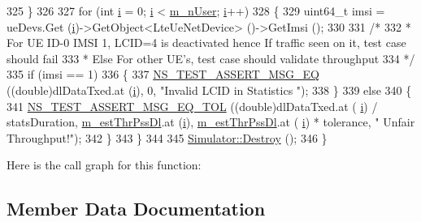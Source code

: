 \begin{DoxyCode}
325     \}
326 
327   \textcolor{keywordflow}{for} (\textcolor{keywordtype}{int} \hyperlink{bernuolliDistribution_8m_a6f6ccfcf58b31cb6412107d9d5281426}{i} = 0; \hyperlink{bernuolliDistribution_8m_a6f6ccfcf58b31cb6412107d9d5281426}{i} < \hyperlink{classns3_1_1LenaDeactivateBearerTestCase_a119f58840a145a5be90eef6e01784ee6}{m\_nUser}; \hyperlink{bernuolliDistribution_8m_a6f6ccfcf58b31cb6412107d9d5281426}{i}++)
328     \{
329       uint64\_t imsi = ueDevs.Get (\hyperlink{bernuolliDistribution_8m_a6f6ccfcf58b31cb6412107d9d5281426}{i})->GetObject<LteUeNetDevice> ()->GetImsi ();
330 
331       \textcolor{comment}{/*}
332 \textcolor{comment}{       * For UE ID-0 IMSI 1, LCID=4 is deactivated hence If traffic seen on it, test case should fail}
333 \textcolor{comment}{       * Else For other UE's, test case should validate throughput}
334 \textcolor{comment}{       */}
335       \textcolor{keywordflow}{if} (imsi == 1)
336         \{
337           \hyperlink{group__testing_ga2a9d78cffb3db8e867c35fff0b698cf5}{NS\_TEST\_ASSERT\_MSG\_EQ} ((\textcolor{keywordtype}{double})dlDataTxed.at (\hyperlink{bernuolliDistribution_8m_a6f6ccfcf58b31cb6412107d9d5281426}{i}), 0, \textcolor{stringliteral}{"Invalid LCID in
       Statistics "});
338         \}
339       \textcolor{keywordflow}{else}
340         \{
341           \hyperlink{group__testing_ga9e7861b56b4e70db3b56044cb7a28e41}{NS\_TEST\_ASSERT\_MSG\_EQ\_TOL} ((\textcolor{keywordtype}{double})dlDataTxed.at (
      \hyperlink{bernuolliDistribution_8m_a6f6ccfcf58b31cb6412107d9d5281426}{i}) / statsDuration, \hyperlink{classns3_1_1LenaDeactivateBearerTestCase_afdb8a203e9b78c7d4b6262958d85d6f6}{m\_estThrPssDl}.at (\hyperlink{bernuolliDistribution_8m_a6f6ccfcf58b31cb6412107d9d5281426}{i}), \hyperlink{classns3_1_1LenaDeactivateBearerTestCase_afdb8a203e9b78c7d4b6262958d85d6f6}{m\_estThrPssDl}.at (
      \hyperlink{bernuolliDistribution_8m_a6f6ccfcf58b31cb6412107d9d5281426}{i}) * tolerance, \textcolor{stringliteral}{" Unfair Throughput!"});
342         \}
343     \}
344 
345   \hyperlink{classns3_1_1Simulator_a2a056e59a6623225df0957eda0ee8252}{Simulator::Destroy} ();
346 \}
\end{DoxyCode}


Here is the call graph for this function\+:




\subsection{Member Data Documentation}
